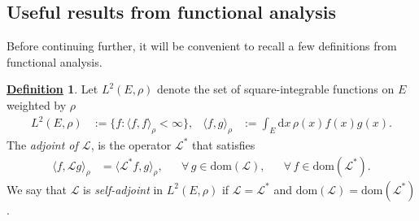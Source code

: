 \documentclass[12pt]{book}
\numberwithin{equation}{chapter}
\theoremstyle{plain}
\numberwithin{theorem}{section}
\theoremstyle{definition}
\newtheorem{definition}[theorem]{\underline{Definition}}
\numberwithin{exercise}{chapter}
\newcommand{\<}{\langle}
\renewcommand{\>}{\rangle}
\renewcommand{\(}{\left(}
\renewcommand{\)}{\right)}
\renewcommand{\[}{\left[}
\renewcommand{\]}{\right]}
\newcommand\Eb{\mathds{E}}
\newcommand\Pb{\mathds{P}}
\newcommand\Ac{\mathscr{A}}
\newcommand\Lc{\mathscr{L}}
\newcommand\sig{\sigma}
\renewcommand\d{\partial}
\newcommand\dd{\mathrm{d}}
\newcommand{\blu}[1]{\textcolor{blue}{#1}}
\begin{document}



\subsection*{Useful results from functional analysis}
Before continuing further, it will be convenient to recall a few definitions from functional analysis.

\begin{definition}
Let $L^2(E,\rho)$ denote the set of square-integrable functions on $E$ weighted by $\rho$
\begin{align}
L^2(E,\rho)
	&:=	\{ f : \< f, f \>_\rho < \infty \} , &
\< f, g \>_\rho
	&:=	\int_E \dd x \, \rho(x) f(x) g(x) .
\end{align}
The \emph{adjoint of $\Lc$}, is the operator $\Lc^*$ that satisfies
\begin{align}
\< f , \Lc g \>_\rho
	&=	\< \Lc^* f , g \>_\rho , &
	&\forall \, g \in \text{dom}(\Lc) , &
	&\forall \, f \in \text{dom}(\Lc^*) .
\end{align}
We say that $\Lc$ is \emph{self-adjoint} in $L^2(E,\rho)$ if $\Lc = \Lc^*$ and $\text{dom}(\Lc) = \text{dom}(\Lc^*)$.
\end{definition}
\end{document}
